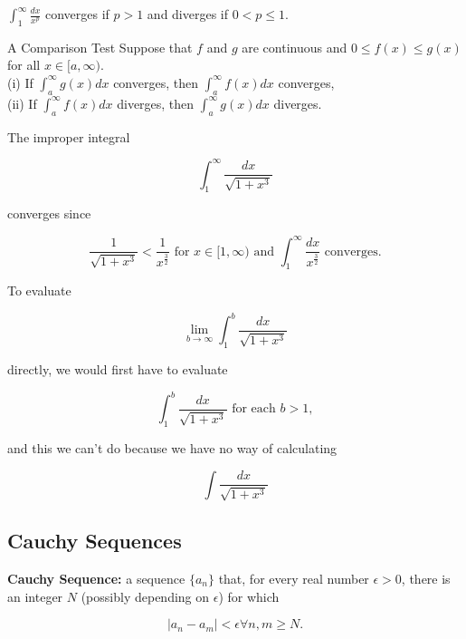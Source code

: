         \begin{corollemma}{}
            $\int_1^{\infty} \frac{dx}{x^p}$ converges if $p > 1$ and diverges if $0 < p \leq 1$.
        \end{corollemma}

        \begin{corollemma}{A Comparison Test}
            Suppose that $f$ and $g$ are continuous and $0 \leq f(x) \leq g(x)$ for all $x\in [a,\infty)$. \\

            (i) If $\int_a^{\infty} g(x)dx$ converges, then $\int_a^{\infty} f(x)dx$ converges, \\

            (ii) If $\int_a^{\infty}f(x)dx$ diverges, then $\int_a^{\infty}g(x)dx$ diverges.
        \end{corollemma}

        \textit{} The improper integral

        \[
            \int_1^{\infty} \frac{dx}{\sqrt{1+x^3}}
        \]

        converges since

        \[
            \frac{1}{\sqrt{1+x^3}} < \frac{1}{x^{\frac{3}{2}}} \text{ for } x\in [1,\infty) \text{ and } \int_1^{\infty} \frac{dx}{x^{\frac{3}{2}}} \text{ converges}.
        \]

        To evaluate

        \[
            \lim_{b\to\infty} \int_1^b \frac{dx}{\sqrt{1+x^3}}
        \]

        directly, we would first have to evaluate

        \[
            \int_1^b \frac{dx}{\sqrt{1+x^3}} \text{ for each } b > 1,
        \]

        and this we can't do because we have no way of calculating

        \[
            \int \frac{dx}{\sqrt{1+x^3}}
        \]

    \subsection{Cauchy Sequences}       %

        \textbf{Cauchy Sequence:} a sequence $\{a_n\}$ that, for every real number $\epsilon > 0$, there is an integer $N$ (possibly depending on $\epsilon$) for which

        \[
            |a_n - a_m| < \epsilon \forall n, m \geq N.
        \]

